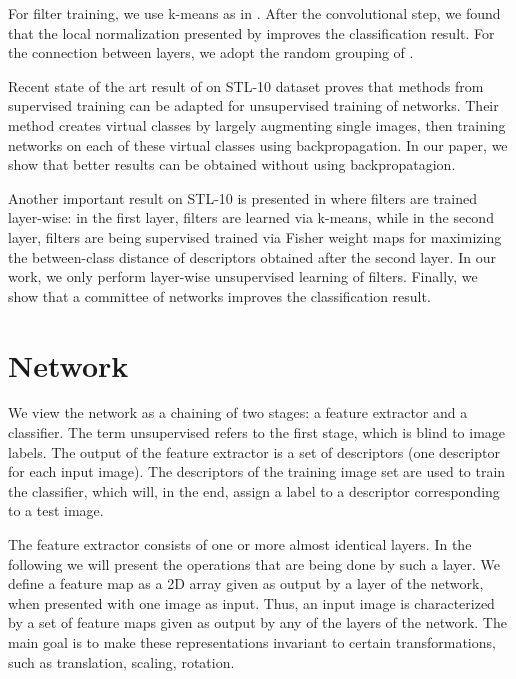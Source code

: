 \documentclass[runningheads]{llncs}
\begin{document}
For filter training, we use k-means as in \cite{Coates_ananalysis}. After the convolutional step, we found that the local normalization presented by \cite{jarrett-iccv-09} improves the classification result. For the connection between layers, we adopt the random grouping of \cite{DBLP:journals/corr/CulurcielloJDB13}.

Recent state of the art result of \cite{DBLP:journals/corr/DosovitskiySB13} on STL-10 dataset proves that methods from supervised training can be adapted for unsupervised training of networks. Their method creates virtual classes by largely augmenting single images, then training networks on each of these virtual classes using backpropagation. In our paper, we show that better results can be obtained without using backpropatagion.

Another important result on STL-10 is presented in \cite{EDCUFWM} where filters are trained layer-wise: in the first layer, filters are learned via k-means, while in the second layer, filters are being supervised trained via Fisher weight maps for maximizing the between-class distance of descriptors obtained after the second layer. In our work, we only perform layer-wise unsupervised learning of filters. Finally, we show that a committee of networks improves the classification result.
\vspace{-0.5cm}

\section{Network}

We view the network as a chaining of two stages: a feature extractor and a classifier.
The term unsupervised refers to the first stage, which is blind to image labels. The output of the feature extractor is a set of descriptors (one descriptor for each input image). The descriptors of the training image set are used to train the classifier, which will, in the end, assign a label to a descriptor corresponding to a test image.

The feature extractor consists of one or more almost identical layers.
In the following we will present the operations that are being done by such a layer.
We define a feature map as a 2D array given as output by a layer of the network, when presented with one image as input. Thus, an input image is characterized by a set of feature maps given as output by any of the layers of the network.
The main goal is to make these representations invariant to certain transformations, such as translation, scaling, rotation.
\end{document}
